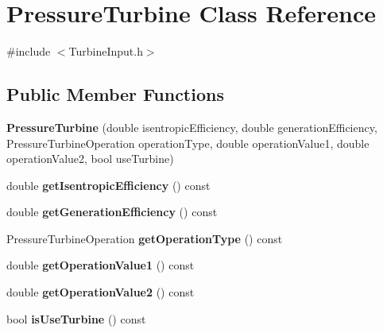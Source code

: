 \hypertarget{class_pressure_turbine}{}\section{Pressure\+Turbine Class Reference}
\label{class_pressure_turbine}


{\ttfamily \#include $<$Turbine\+Input.\+h$>$}

\subsection*{Public Member Functions}
\begin{DoxyCompactItemize}
\item 
\mbox{\label{class_pressure_turbine_a73df3943891acc547e642956597e3fe0}} 
{\bfseries Pressure\+Turbine} (double isentropic\+Efficiency, double generation\+Efficiency, Pressure\+Turbine\+Operation operation\+Type, double operation\+Value1, double operation\+Value2, bool use\+Turbine)
\item 
\mbox{\label{class_pressure_turbine_a15ed3b71b89861792f29dd6c1c1d704c}} 
double {\bfseries get\+Isentropic\+Efficiency} () const
\item 
\mbox{\label{class_pressure_turbine_a0c1411ac58d31f57e0aec8f80d73c39f}} 
double {\bfseries get\+Generation\+Efficiency} () const
\item 
\mbox{\label{class_pressure_turbine_a4618372da7c53adbececfc476c6775b0}} 
Pressure\+Turbine\+Operation {\bfseries get\+Operation\+Type} () const
\item 
\mbox{\label{class_pressure_turbine_a95e1c8725ad8035549baf8877343d3d9}} 
double {\bfseries get\+Operation\+Value1} () const
\item 
\mbox{\label{class_pressure_turbine_aee57986c0c741d5b1df72fb00f480a56}} 
double {\bfseries get\+Operation\+Value2} () const
\item 
\mbox{\label{class_pressure_turbine_ac8064c2c5c1b5acd7846a3a8036ef0bb}} 
bool {\bfseries is\+Use\+Turbine} () const
\item 

\end{DoxyCompactItemize}
